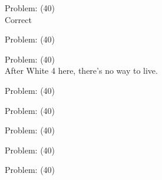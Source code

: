 \documentclass[11pt]{article}
\begin{document}
\begin{minipage}[t]{0.5\textwidth}
  {\centering
  
Problem: (40)\\
Correct\\
  }
\end{minipage}
\begin{minipage}[t]{0.5\textwidth}
  {\centering
  
Problem: (40)\\
  }
\end{minipage}
\begin{minipage}[t]{0.5\textwidth}
  {\centering
  
Problem: (40)\\
After White 4 here, there's no way to live.\\
  }
\end{minipage}
\begin{minipage}[t]{0.5\textwidth}
  {\centering
  
Problem: (40)\\
  }
\end{minipage}
\begin{minipage}[t]{0.5\textwidth}
  {\centering
  
Problem: (40)\\
  }
\end{minipage}
\begin{minipage}[t]{0.5\textwidth}
  {\centering
  
Problem: (40)\\
  }
\end{minipage}
\begin{minipage}[t]{0.5\textwidth}
  {\centering
  
Problem: (40)\\
  }
\end{minipage}
\begin{minipage}[t]{0.5\textwidth}
  {\centering
  
Problem: (40)\\
  }
\end{minipage}
\end{document}
